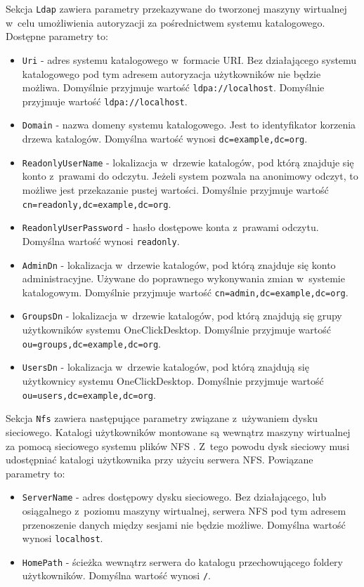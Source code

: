 \documentclass[../opis-rozwiazania.tex]{subfiles}
\begin{document}
Sekcja \texttt{Ldap} zawiera parametry przekazywane do tworzonej maszyny wirtualnej w~celu umożliwienia autoryzacji za pośrednictwem systemu katalogowego. Dostępne parametry to:
\begin{itemize}
	\item \texttt{Uri} - adres systemu katalogowego w~formacie URI. Bez działającego systemu katalogowego pod tym adresem autoryzacja użytkowników nie będzie możliwa. Domyślnie przyjmuje wartość \texttt{ldpa://localhost}. Domyślnie przyjmuje wartość \texttt{ldpa://localhost}.
	\item \texttt{Domain} - nazwa domeny systemu katalogowego. Jest to identyfikator korzenia drzewa katalogów. Domyślna wartość wynosi \texttt{dc=example,dc=org}.
	\item \texttt{ReadonlyUserName} - lokalizacja w~drzewie katalogów, pod którą znajduje się konto z~prawami do odczytu. Jeżeli system pozwala na anonimowy odczyt, to możliwe jest przekazanie pustej wartości. Domyślnie przyjmuje wartość \texttt{cn=readonly,dc=example,dc=org}.
	\item \texttt{ReadonlyUserPassword} - hasło dostępowe konta z~prawami odczytu. Domyślna wartość wynosi \texttt{readonly}.
	\item \texttt{AdminDn} - lokalizacja w~drzewie katalogów, pod którą znajduje się konto administracyjne. Używane do poprawnego wykonywania zmian w~systemie katalogowym. Domyślnie przyjmuje wartość \texttt{cn=admin,dc=example,dc=org}.
	\item \texttt{GroupsDn} - lokalizacja w~drzewie katalogów, pod którą znajdują się grupy użytkowników systemu OneClickDesktop. Domyślnie przyjmuje wartość \texttt{ou=groups,dc=example,dc=org}.
	\item \texttt{UsersDn} - lokalizacja w~drzewie katalogów, pod którą znajdują się użytkownicy systemu OneClickDesktop. Domyślnie przyjmuje wartość \texttt{ou=users,dc=example,dc=org}.
\end{itemize}

Sekcja \texttt{Nfs} zawiera następujące parametry związane z~używaniem dysku sieciowego. Katalogi użytkowników montowane są wewnątrz maszyny wirtualnej za pomocą sieciowego systemu plików NFS \parencite{nfs}. Z~tego powodu dysk sieciowy musi udostępniać katalogi użytkownika przy użyciu serwera NFS. Powiązane parametry to:
\begin{itemize}
	\item \texttt{ServerName} - adres dostępowy dysku sieciowego. Bez działającego, lub osiągalnego z~poziomu maszyny wirtualnej, serwera NFS pod tym adresem przenoszenie danych między sesjami nie będzie możliwe. Domyślna wartość wynosi \texttt{localhost}.
	\item \texttt{HomePath} - ścieżka wewnątrz serwera do katalogu przechowującego foldery użytkowników. Domyślna wartość wynosi \texttt{/}.
\end{itemize}
\end{document}
